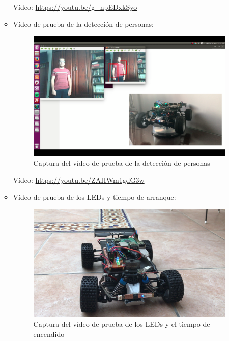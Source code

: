 \documentclass{pclass}
\begin{document}
\begin{enumerate}[a)]
\begin{itemize}
				 Vídeo: \url{https://youtu.be/g_npEDxkSyo}
				 
				 \item Vídeo de prueba de la detección de personas:
				 
				 \begin{figure}[H]
				 	\centering
				 	\includegraphics[width=1\textwidth]{img/capturaAut}
				 	\caption{Captura del vídeo de prueba de la detección de personas}
				 	\label{fig:capturaAut}
				 \end{figure}
				 
				 Vídeo: \url{https://youtu.be/ZAHWm1gdG3w}
				 
				\clearpage
				\item Vídeo de prueba de los LEDs y tiempo de arranque:
				
				\begin{figure}[H]
					\centering
					\includegraphics[width=1\textwidth]{img/testLeds}
					\caption{Captura del vídeo de prueba de los LEDs y el tiempo de encendido}
					\label{fig:capturaLeds}
				\end{figure}
				

\end{itemize}
\end{enumerate}
\end{document}
